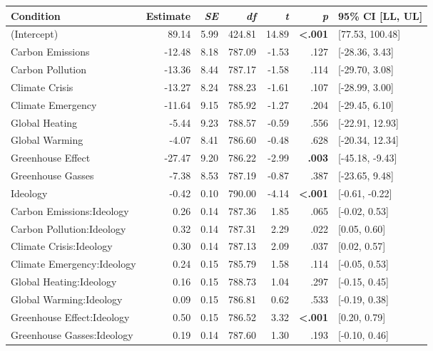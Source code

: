 \begin{table}[ht]
\centering
\begin{tabular}{lrrrrrl}
  \hline
Condition & Estimate & \textit{SE} & \textit{df} & \textit{t} & \textit{p} & 95\% CI [LL, UL] \\ 
  \hline
(Intercept) & 89.14 & 5.99 & 424.81 & 14.89 & \textbf{\textless  .001} & [77.53, 100.48] \\ 
  Carbon Emissions & -12.48 & 8.18 & 787.09 & -1.53 & .127 & [-28.36, 3.43] \\ 
  Carbon Pollution & -13.36 & 8.44 & 787.17 & -1.58 & .114 & [-29.70, 3.08] \\ 
  Climate Crisis & -13.27 & 8.24 & 788.23 & -1.61 & .107 & [-28.99, 3.00] \\ 
  Climate Emergency & -11.64 & 9.15 & 785.92 & -1.27 & .204 & [-29.45, 6.10] \\ 
  Global Heating & -5.44 & 9.23 & 788.57 & -0.59 & .556 & [-22.91, 12.93] \\ 
  Global Warming & -4.07 & 8.41 & 786.60 & -0.48 & .628 & [-20.34, 12.34] \\ 
  Greenhouse Effect & -27.47 & 9.20 & 786.22 & -2.99 & \textbf{.003} & [-45.18, -9.43] \\ 
  Greenhouse Gasses & -7.38 & 8.53 & 787.19 & -0.87 & .387 & [-23.65, 9.48] \\ 
  Ideology & -0.42 & 0.10 & 790.00 & -4.14 & \textbf{\textless  .001} & [-0.61, -0.22] \\ 
  Carbon Emissions:Ideology & 0.26 & 0.14 & 787.36 & 1.85 & .065 & [-0.02, 0.53] \\ 
  Carbon Pollution:Ideology & 0.32 & 0.14 & 787.31 & 2.29 & .022 & [0.05, 0.60] \\ 
  Climate Crisis:Ideology & 0.30 & 0.14 & 787.13 & 2.09 & .037 & [0.02, 0.57] \\ 
  Climate Emergency:Ideology & 0.24 & 0.15 & 785.79 & 1.58 & .114 & [-0.05, 0.53] \\ 
  Global Heating:Ideology & 0.16 & 0.15 & 788.73 & 1.04 & .297 & [-0.15, 0.45] \\ 
  Global Warming:Ideology & 0.09 & 0.15 & 786.81 & 0.62 & .533 & [-0.19, 0.38] \\ 
  Greenhouse Effect:Ideology & 0.50 & 0.15 & 786.52 & 3.32 & \textbf{\textless  .001} & [0.20, 0.79] \\ 
  Greenhouse Gasses:Ideology & 0.19 & 0.14 & 787.60 & 1.30 & .193 & [-0.10, 0.46] \\ 
   \hline
\end{tabular}
\end{table}
